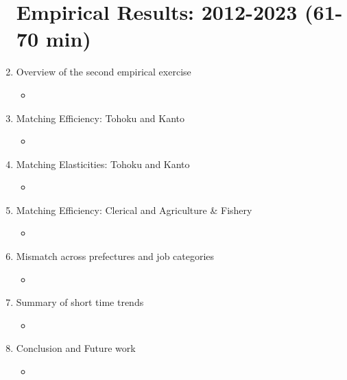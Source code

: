 \documentclass[12pt]{article}
\begin{document}
\begin{enumerate}
    \section{Empirical Results: 2012-2023 (61-70 min)}
    \item Overview of the second empirical exercise
    \begin{itemize}
        \item 
    \end{itemize}
    \item Matching Efficiency: Tohoku and Kanto
    \begin{itemize}
        \item 
    \end{itemize}
    \item Matching Elasticities: Tohoku and Kanto
    \begin{itemize}
        \item 
    \end{itemize}
    \item Matching Efficiency: Clerical and Agriculture \& Fishery
    \begin{itemize}
        \item 
    \end{itemize}
    \item Mismatch across prefectures and job categories
    \begin{itemize}
        \item 
    \end{itemize}
    \item Summary of short time trends
    \begin{itemize}
        \item 
    \end{itemize}
    \item Conclusion and Future work
    \begin{itemize}
        \item 
    \end{itemize}
\end{enumerate}
\end{document}
